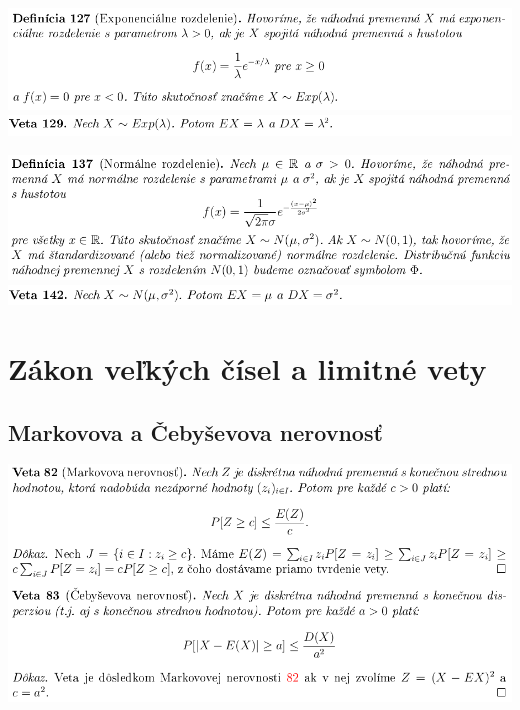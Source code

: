 \includegraphics[width=1\textwidth]{images/pravdepodobnost/exp_rozd}\\
\includegraphics[width=1\textwidth]{images/pravdepodobnost/exp_rozd_II}

\includegraphics[width=1\textwidth]{images/pravdepodobnost/norm_rozd}\\
\includegraphics[width=1\textwidth]{images/pravdepodobnost/norm_rozd_II}\\

\section{Zákon veľkých čísel a limitné vety}

\subsection {Markovova a Čebyševova nerovnosť}
\includegraphics[width=1\textwidth]{images/pravdepodobnost/mark_cebys_ner}\\

